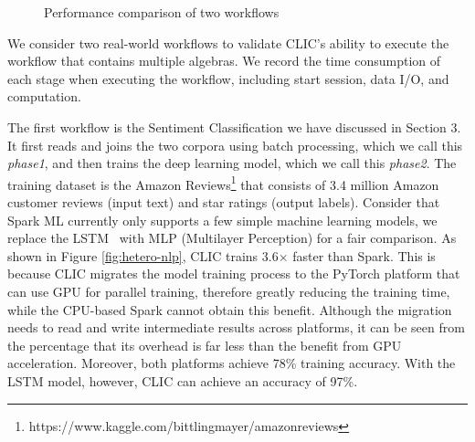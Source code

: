\begin{figure}
  \centering
  \caption{Performance comparison of two workflows}
  \label{fig:hetero}
\end{figure}

We consider two real-world workflows to validate CLIC’s ability to execute the workflow that contains multiple algebras. We record the time consumption of each stage when executing the workflow, including start session, data I/O, and computation.

The first workflow is the Sentiment Classification we have discussed in Section 3. It first reads and joins the two corpora using batch processing, which we call this \textit{phase1}, and then trains the deep learning model, which we call this \textit{phase2}. The training dataset is the Amazon Reviews\footnote{https://www.kaggle.com/bittlingmayer/amazonreviews} that consists of 3.4 million Amazon customer reviews (input text) and star ratings (output labels). Consider that Spark ML currently only supports a few simple machine learning models, we replace the LSTM~\cite{hochreiter1997long} with MLP (Multilayer Perception) for a fair comparison. As shown in Figure \ref{fig:hetero-nlp}, CLIC trains 3.6$\times$ faster than Spark. This is because CLIC migrates the model training process to the PyTorch platform that can use GPU for parallel training, therefore greatly reducing the training time, while the CPU-based Spark cannot obtain this benefit. Although the migration needs to read and write intermediate results across platforms, it can be seen from the percentage that its overhead is far less than the benefit from GPU acceleration. Moreover, both platforms achieve 78\% training accuracy. With the LSTM model, however, CLIC can achieve an accuracy of 97\%.

